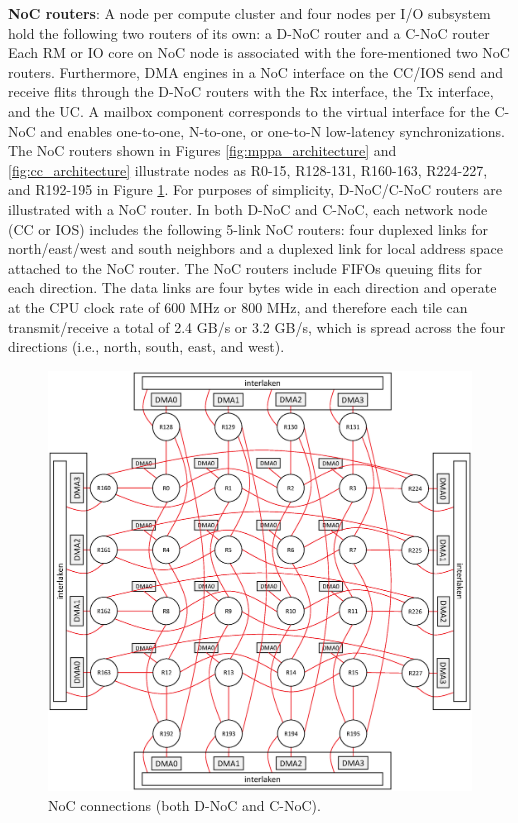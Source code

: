 \documentclass[conference,compsoc]{IEEEtran}
\begin{document}
\textbf{NoC routers}:
A node per compute cluster and four nodes per I/O subsystem hold the following two routers of its
own: a D-NoC router and a C-NoC router
Each RM or IO core on NoC node is associated with the fore-mentioned two NoC routers.
Furthermore, DMA engines in a NoC interface on the CC/IOS send and receive flits through the D-NoC routers with the Rx interface, the Tx interface, and the UC.
A mailbox component corresponds to the virtual interface for the C-NoC and enables one-to-one, N-to-one, or one-to-N low-latency synchronizations.
The NoC routers shown in Figures \ref{fig:mppa_architecture} and \ref{fig:cc_architecture} illustrate nodes as R0-15, R128-131, R160-163, R224-227, and R192-195 in Figure \ref{fig:noc_map}.
For purposes of simplicity, D-NoC/C-NoC routers are illustrated with a NoC router.
In both D-NoC and C-NoC, each network node (CC or IOS)  includes the following 5-link NoC routers:
four duplexed links for north/east/west and south neighbors and a duplexed link for local address space attached to the NoC router.
The NoC routers include FIFOs queuing flits for each direction.
The data links are four bytes wide in each direction and operate at the CPU clock rate of 600 MHz or 800 MHz, and therefore each tile can transmit/receive a total of 2.4 GB/s or 3.2 GB/s, which is spread across the four directions (i.e., north, south, east, and west).

\begin{figure}[t]
  \centering
  \includegraphics[width=1.0\linewidth]{../figure/noc_map.eps}
  \caption{\label{fig:noc_map}
    NoC connections (both D-NoC and C-NoC).}
\end{figure}
\end{document}
